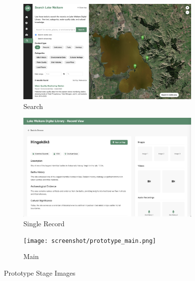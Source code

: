 \begin{figure}[H]
  \vspace{0.5cm}

  \begin{subfigure}[b]{0.3\textwidth}
    \includegraphics[width=\textwidth]{screenshot/prototype_search.png}
    \caption{Search}
  \end{subfigure}\hfill
  \begin{subfigure}[b]{0.3\textwidth}
    \includegraphics[width=\textwidth]{screenshot/prototype_single_record.png}
    \caption{Single Record}
  \end{subfigure}\hfill
  \begin{subfigure}[b]{0.3\textwidth}
    \texttt{[image: screenshot/prototype\_main.png]}
    \caption{Main}
  \end{subfigure}

  \caption{Prototype Stage Images}
  \label{fig:prototype}
\end{figure}

